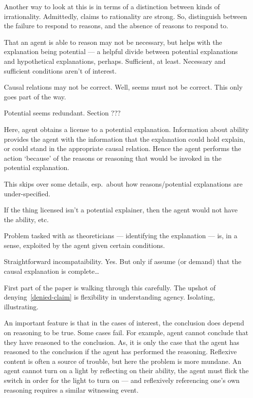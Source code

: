 \documentclass[10pt]{article}
\newcommand{\hozlinedash}[0]{%
  \noindent\hdashrule[0.5ex][c]{\textwidth}{.1pt}{2.5pt}
}
\begin{document}
\begin{note}[Rationality]
  Another way to look at this is in terms of a distinction between kinds of irrationality.
  Admittedly, claims to rationality are strong.
  So, distinguish between the failure to respond to reasons, and the absence of reasons to respond to.
\end{note}

\hozlinedash





That an agent is able to reason may not be necessary, but helps with the explanation being potential --- a helpful divide between potential explanations and hypothetical explanations, perhaps.
Sufficient, at least.
Necessary and sufficient conditions aren't of interest.


Causal relations may not be correct.
Well, seems must not be correct.
This only goes part of the way.

Potential seems redundant.
Section ???

Here, agent obtains a license to a potential explanation.
Information about ability provides the agent with the information that the explanation could hold explain, or could stand in the appropriate causal relation.
Hence the agent performs the action `because' of the reasons or reasoning that would be invoked in the potential explanation.

{
\color{red} This skips over some details, esp.\ about how reasons/potential explanations are under-specified.
}

If the thing licensed isn't a potential explainer, then the agent would not have the ability, etc.\

Problem tasked with as theoreticians --- identifying the explanation --- is, in a sense, exploited by the agent given certain conditions.

Straightforward incompataibility.
Yes.
But only if assume (or demand) that the causal explanation is complete\dots




{
  \color{red}
  First part of the paper is walking through this carefully.
}
The upshot of denying~\ref{denied-claim} is flexibility in understanding agency.
Isolating, illustrating.



An important feature is that in the cases of interest, the conclusion does depend on reasoning to be true.
Some cases fail.
For example, agent cannot conclude that they have reasoned to the conclusion.
As, it is only the case that the agent has reasoned to the conclusion if the agent has performed the reasoning.
Reflexive content is often a source of trouble, but here the problem is more mundane.
An agent cannot turn on a light by reflecting on their ability, the agent must flick the switch in order for the light to turn on --- and reflexively referencing one's own reasoning requires a similar witnessing event.
\end{document}
